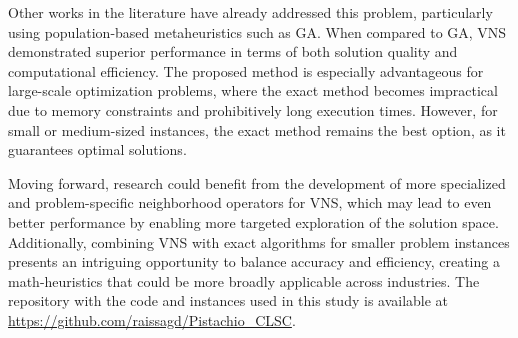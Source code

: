 \documentclass[sn-nature]{sn-jnl}%
\theoremstyle{thmstyleone}%
\theoremstyle{thmstyletwo}%
\theoremstyle{thmstylethree}%
\begin{document}

Other works in the literature have already addressed this problem, particularly using population-based metaheuristics such as GA. When compared to GA, VNS demonstrated superior performance in terms of both solution quality and computational efficiency. The proposed method is especially advantageous for large-scale optimization problems, where the exact method becomes impractical due to memory constraints and prohibitively long execution times. However, for small or medium-sized instances, the exact method remains the best option, as it guarantees optimal solutions.


Moving forward, research could benefit from the development of more specialized and problem-specific neighborhood operators for VNS, which may 
lead to even better performance by enabling more targeted exploration of the solution space. Additionally, combining VNS with exact algorithms for 
smaller problem instances presents an intriguing opportunity to balance accuracy and efficiency, creating a math-heuristics that could be more broadly 
applicable across industries. The repository with the code and instances used in this study is available at \url{https://github.com/raissagd/Pistachio_CLSC}.


\end{document}
